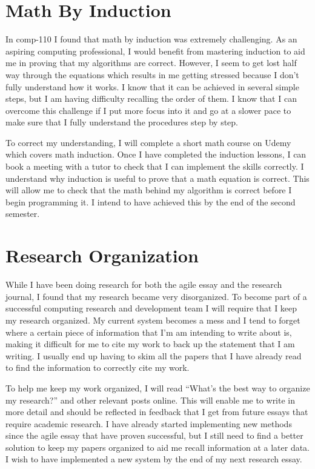 \documentclass{scrartcl}
\begin{document}
\section{Math By Induction}

In comp-110 I found that math by induction was extremely challenging. As an aspiring computing professional, I would benefit from mastering induction to aid me in proving that my algorithms are correct. However, I seem to get lost half way through the equations which results in me getting stressed because I don’t fully understand how it works. I know that it can be achieved in several simple steps, but I am having difficulty recalling the order of them. I know that I can overcome this challenge if I put more focus into it and go at a slower pace to make sure that I fully understand the procedures step by step.

To correct my understanding, I will complete a short math course on Udemy \cite{Udemy} which covers math induction. Once I have completed the induction lessons, I can book a meeting with a tutor to check that I can implement the skills correctly. I understand why induction is useful to prove that a math equation is correct. This will allow me to check that the math behind my algorithm is correct before I begin programming it. I intend to have achieved this by the end of the second semester. 

\section{Research Organization}

While I have been doing research for both the agile essay and the research journal, I found that my research became very disorganized. To become part of a successful computing research and development team I will require that I keep my research organized. My current system becomes a mess and I tend to forget where a certain piece of information that I’m am intending to write about is, making it difficult for me to cite my work to back up the statement that I am writing. I usually end up having to skim all the papers that I have already read to find the information to correctly cite my work.

To help me keep my work organized, I will read ``What’s the best way to organize my research?'' \cite{research} and other relevant posts online. This will enable me to write in more detail and should be reflected in feedback that I get from future essays that require academic research. I have already started implementing new methods since the agile essay that have proven successful, but I still need to find a better solution to keep my papers organized to aid me recall information at a later data. I wish to have implemented a new system by the end of my next research essay.
\end{document}
